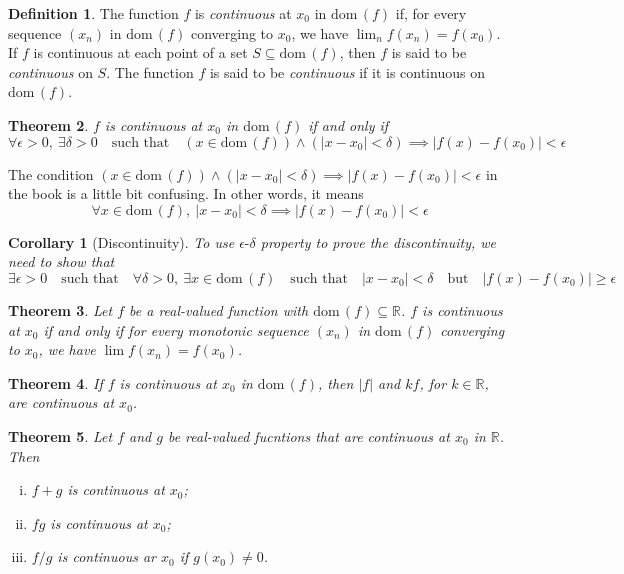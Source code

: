 \documentclass[12pt, lettersize]{book}
\theoremstyle{plain}
\newtheorem{thm}{Theorem}[section]
\newtheorem{cor}{Corollary}[thm]
\theoremstyle{definition}
\newtheorem{dfn}[thm]{Definition}
\theoremstyle{remark}
\newcommand{\R}{\mathbb{R}}
\newcommand{\dom}{\text{dom}\,}
\begin{document}
		\begin{dfn}\label{def:continuous}
			The function $f$ is \emph{continuous} at $x_0$ in $\dom(f)$ if, for every sequence $(x_n)$ in $\dom(f)$ converging to $x_0$, we have $\lim_nf(x_n)=f(x_0)$. If $f$ is continuous at each point of a set $S\subseteq\dom(f)$, then $f$ is said to be \emph{continuous} on $S$. The function $f$ is said to be
			\emph{continuous} if it is continuous on $\dom(f)$.
		\end{dfn}
		
		\setcounter{equation}{0}
		\begin{thm}\label{def:delta-epsilon property}
			$f$ is continuous at $x_0$ in $\dom(f)$ if and only if
			\begin{equation}
				\forall\epsilon>0,\ \exists\delta>0\quad\text{such 	that}\quad(x\in\dom(f))\land(|x-x_0|<\delta)\implies|f(x)-f(x_0)|<\epsilon
			\end{equation}
		\end{thm}
		The condition $(x\in\dom(f))\land(|x-x_0|<\delta)\implies|f(x)-f(x_0)|<\epsilon$ in the book is a little bit
		confusing. In other words, it means
		\begin{displaymath}
			\forall x\in\dom(f),\ |x-x_0|<\delta\implies|f(x)-f(x_0)|<\epsilon
		\end{displaymath}
		
		\begin{cor}[Discontinuity]
			To use $\epsilon\text{-}\delta$ property to prove the discontinuity, we need to show that
			\begin{displaymath}
				\exists\epsilon>0\quad\text{such that}\quad\forall\delta>0,\ \exists x\in\dom(f)\quad\text{such that}\quad |x-x_0|<\delta\quad\text{but}\quad|f(x)-f(x_0)|\geq\epsilon
			\end{displaymath}
		\end{cor}
		
		\begin{thm}
			Let $f$ be a real-valued function with $\dom(f)\subseteq\R$. $f$ is continuous at $x_0$ if and only if for every monotonic sequence $(x_n)$ in $\dom(f)$ converging to $x_0$, we have $\lim f(x_n)=f(x_0)$.
		\end{thm}
		
		\begin{thm}\label{def:17.3}
			If $f$ is continuous at $x_0$ in $\dom(f)$, then $|f|$ and $kf$, for $k\in\R$, are continuous at $x_0$.
		\end{thm}
		
		\begin{thm}\label{def:17.4}
			Let $f$ and $g$ be real-valued fucntions that are continuous at $x_0$ in $\R$. Then
			\begin{enumerate}[(i)]
				\item $f+g$ is continuous at $x_0$;
				\item $fg$ is continuous at $x_0$;
				\item $f/g$ is continuous ar $x_0$ if $g(x_0)\neq0$.
			\end{enumerate}
		\end{thm}
		
\end{document}
